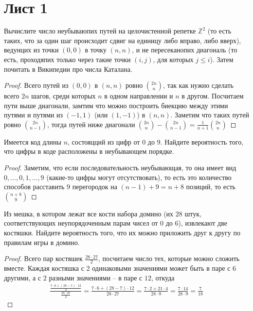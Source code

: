 \section{Лист 1}
    \begin{prob}
        Вычислите число неубываюпих путей на целочистенной репетке $\mathbb{Z}^{2}$ (то есть таких, что за один шаг происходит сдвиг на единицу либо вправо, либо вверх), ведунцих из точки $(0,0)$ в точку $(n, n)$, и не пересеканопих диагональ (то есть, проходяпих только через такие точки $(i, j)$, для которых $j \leq i$). Затем почитать в Википедии про числа Каталана.
    \end{prob}
    \begin{proof}
        Всего путей из $(0,0)$ в $(n,n)$ ровно ${{2n}\choose{n}}$, так как нужно сделать всего $2n$ шагов, среди которых $n$ в одном направлении и $n$ в другом. Посчитаем пути выше диагонали, замтим что можно построить биекцию между этими путями и путями из $(-1, 1)$ (или $(1, -1)$) в $(n,n)$. Заметим что таких путей ровно ${{2n}\choose{n-1}}$, тогда путей ниже диагонали ${{2n}\choose{n}} - {{2n}\choose{n-1}} = \frac{1}{n+1} {{2n}\choose{n}}$
    \end{proof}
\vskip 0.6in


    \begin{prob}
        Имеется код длины $n$, состояцций из цифр от $0$ до $9$. Найдите вероятность того, что цифры в коде расположены в неубывающем порядке.
    \end{prob}
    \begin{proof}
        Заметим, что если последовательность неубывающая, то она имеет вид $0, \ldots, 0, 1 ,\ldots, 9$ (какие-то цифры могут отсутствовать), то есть это количество способов расставить $9$ перегородок на $(n-1) + 9 = n+8$ позиций, то есть ${{n+8}\choose{9}}$
    \end{proof}
\vskip 0.6in


    \begin{prob}
        Из мешка, в котором лежат все кости набора домино (их $28$ штук, соответствующих неупорядоченным парам чисел от $0$ до $6$), извлекают две костяшки. Найдите вероятность того, что их можно приложить друг к другу по правилам игры в домино.
    \end{prob}
    \begin{proof}
        Всего пар костяшек $\frac{28 \cdot 27}{2}$, посчитаем число тех, которые можно сложить вместе. Каждая костяшка с 2 одинаковыми значениями может быть в паре с $6$ другими, а с $2$ разными значениями --  в паре с $12$, откуда
        \begin{gather*}
            \frac{\frac{7 \cdot 6 + (28-7) \cdot 12}{2}}{\frac{28 \cdot 27}{2}}
            = \frac{7 \cdot 6 + (28 - 7) \cdot 12}{28 \cdot 27}
            = \frac{7 \cdot 2 + 21 \cdot 4}{28 \cdot 9}
            = \frac{7 \cdot 14}{28 \cdot 9}
            = \frac{7}{18}
        \end{gather*}
    \end{proof}
\vskip 0.6in


